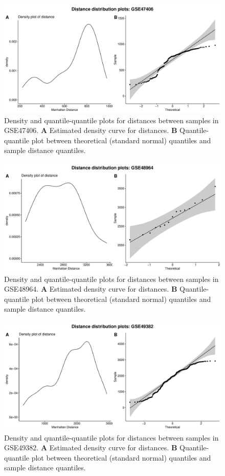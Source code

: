 \documentclass[10pt,letterpaper]{article}\usepackage[]{graphicx}\usepackage[]{color}
\begin{document}
\begin{figure}[H]
	\includegraphics[width=\textwidth]{manhattan-distance_hist_GSE47406.pdf}
	\caption{Density and quantile-quantile plots for distances between samples in GSE47406. \textbf{A} Estimated density curve for distances. \textbf{B} Quantile-quantile plot between theoretical (standard normal) quantiles and sample distance quantiles.}
\end{figure}

\begin{figure}[H]
	\includegraphics[width=\textwidth]{manhattan-distance_hist_GSE48964.pdf}
	\caption{Density and quantile-quantile plots for distances between samples in GSE48964. \textbf{A} Estimated density curve for distances. \textbf{B} Quantile-quantile plot between theoretical (standard normal) quantiles and sample distance quantiles.}
\end{figure}

\begin{figure}[H]
	\includegraphics[width=\textwidth]{manhattan-distance_hist_GSE49382.pdf}
	\caption{Density and quantile-quantile plots for distances between samples in GSE49382. \textbf{A} Estimated density curve for distances. \textbf{B} Quantile-quantile plot between theoretical (standard normal) quantiles and sample distance quantiles.}
\end{figure}
\end{document}
